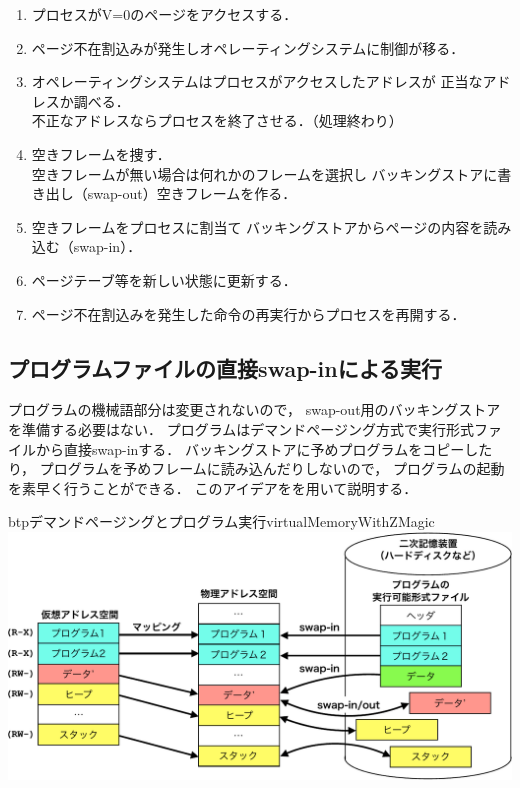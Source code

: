 \begin{enumerate}
\item プロセスがV=0のページをアクセスする．
\item ページ不在割込みが発生しオペレーティングシステムに制御が移る．
\item オペレーティングシステムはプロセスがアクセスしたアドレスが
  正当なアドレスか調べる．\\
  不正なアドレスならプロセスを終了させる．（処理終わり）
\item 空きフレームを捜す．\\
  空きフレームが無い場合は何れかのフレームを選択し
  バッキングストアに書き出し（swap-out）空きフレームを作る．
\item 空きフレームをプロセスに割当て
  バッキングストアからページの内容を読み込む（swap-in）．
\item ページテーブ等を新しい状態に更新する．
\item ページ不在割込みを発生した命令の再実行からプロセスを再開する．
\end{enumerate}

\subsection{プログラムファイルの直接swap-inによる実行}
プログラムの機械語部分は変更されないので，
swap-out用のバッキングストアを準備する必要はない．
プログラムはデマンドページング方式で実行形式ファイルから直接swap-inする．
バッキングストアに予めプログラムをコピーしたり，
プログラムを予めフレームに読み込んだりしないので，
プログラムの起動を素早く行うことができる．
このアイデアをを用いて説明する．

\begin{myfig}{btp}{デマンドページングとプログラム実行}{virtualMemoryWithZMagic}
  \includegraphics[scale=0.66]{Fig/virtualMemoryWithZMagic-crop.pdf}
\end{myfig}

